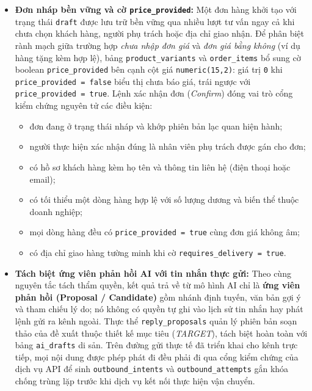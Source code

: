 \begin{itemize}
  \item \textbf{Đơn nháp bền vững và cờ \texttt{price\_\hspace{0pt}provided}:} Một đơn hàng khởi tạo với trạng thái \texttt{draft} được lưu trữ bền vững qua nhiều lượt tư vấn ngay cả khi chưa chọn khách
    hàng, người phụ trách hoặc địa chỉ giao nhận. Để phân biệt rành mạch giữa trường hợp \emph{chưa nhập đơn giá} và \emph{đơn giá bằng không} (ví dụ hàng tặng kèm hợp lệ), bảng
    \texttt{product\_\hspace{0pt}variants} và \texttt{order\_\hspace{0pt}items} bổ sung cờ boolean \texttt{price\_\hspace{0pt}provided} bên cạnh cột giá \texttt{numeric(15,2)}: giá trị \texttt{0} khi \texttt{price\_\hspace{0pt}provided =
    false} biểu thị chưa báo giá, trái ngược với \texttt{price\_\hspace{0pt}provided = true}. Lệnh xác nhận đơn (\emph{Confirm}) đóng vai trò cổng kiểm chứng nguyên tử các điều kiện:
  \begin{itemize}
    \item đơn đang ở trạng thái nháp và khớp phiên bản lạc quan hiện hành;
    \item người thực hiện xác nhận đúng là nhân viên phụ trách được gán cho đơn;
    \item có hồ sơ khách hàng kèm họ tên và thông tin liên hệ (điện thoại hoặc email);
    \item có tối thiểu một dòng hàng hợp lệ với số lượng dương và biến thể thuộc doanh nghiệp;
    \item mọi dòng hàng đều có \texttt{price\_\hspace{0pt}provided = true} cùng đơn giá không âm;
    \item có địa chỉ giao hàng tường minh khi cờ \texttt{requires\_\hspace{0pt}delivery = true}.
  \end{itemize}
  \item \textbf{Tách biệt ứng viên phản hồi AI với tin nhắn thực gửi:} Theo cùng nguyên tắc tách thẩm quyền, kết quả trả về từ mô hình AI chỉ là \textbf{ứng viên phản hồi (Proposal / Candidate)}
    gồm nhánh định tuyến, văn bản gợi ý và tham chiếu lý do; nó không có quyền tự ghi vào lịch sử tin nhắn hay phát lệnh gửi ra kênh ngoài. Thực thể \texttt{reply\_\hspace{0pt}proposals} quản lý phiên bản
    soạn thảo của đề xuất thuộc thiết kế mục tiêu (\emph{TARGET}), tách biệt hoàn toàn với bảng \texttt{ai\_\hspace{0pt}drafts} di sản. Trên đường gửi thực tế đã triển khai cho kênh trực tiếp, mọi nội dung
    được phép phát đi đều phải đi qua cổng kiểm chứng của dịch vụ API để sinh \texttt{outbound\_\hspace{0pt}intents} và \texttt{outbound\_\hspace{0pt}attempts} gắn khóa chống trùng lặp trước khi dịch vụ kết nối thực
    hiện vận chuyển.
\end{itemize}


